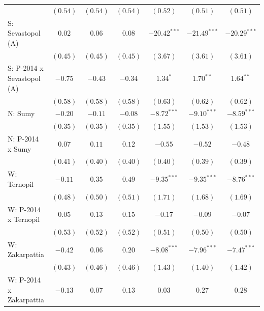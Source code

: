 \begin{table}
\begin{center}
\begin{small}
\begin{tabular}{l c c c c c c}
                            & $(0.54)$      & $(0.54)$       & $(0.54)$       & $(0.52)$       & $(0.51)$       & $(0.51)$       \\
S: Sevastopol (A)           & $0.02$        & $0.06$         & $0.08$         & $-20.42^{***}$ & $-21.49^{***}$ & $-20.29^{***}$ \\
                            & $(0.45)$      & $(0.45)$       & $(0.45)$       & $(3.67)$       & $(3.61)$       & $(3.61)$       \\
S: P-2014 x Sevastopol (A)  & $-0.75$       & $-0.43$        & $-0.34$        & $1.34^{*}$     & $1.70^{**}$    & $1.64^{**}$    \\
                            & $(0.58)$      & $(0.58)$       & $(0.58)$       & $(0.63)$       & $(0.62)$       & $(0.62)$       \\
N: Sumy                     & $-0.20$       & $-0.11$        & $-0.08$        & $-8.72^{***}$  & $-9.10^{***}$  & $-8.59^{***}$  \\
                            & $(0.35)$      & $(0.35)$       & $(0.35)$       & $(1.55)$       & $(1.53)$       & $(1.53)$       \\
N: P-2014 x Sumy            & $0.07$        & $0.11$         & $0.12$         & $-0.55$        & $-0.52$        & $-0.48$        \\
                            & $(0.41)$      & $(0.40)$       & $(0.40)$       & $(0.40)$       & $(0.39)$       & $(0.39)$       \\
W: Ternopil                 & $-0.11$       & $0.35$         & $0.49$         & $-9.35^{***}$  & $-9.35^{***}$  & $-8.76^{***}$  \\
                            & $(0.48)$      & $(0.50)$       & $(0.51)$       & $(1.71)$       & $(1.68)$       & $(1.69)$       \\
W: P-2014 x Ternopil        & $0.05$        & $0.13$         & $0.15$         & $-0.17$        & $-0.09$        & $-0.07$        \\
                            & $(0.53)$      & $(0.52)$       & $(0.52)$       & $(0.51)$       & $(0.50)$       & $(0.50)$       \\
W: Zakarpattia              & $-0.42$       & $0.06$         & $0.20$         & $-8.08^{***}$  & $-7.96^{***}$  & $-7.47^{***}$  \\
                            & $(0.43)$      & $(0.46)$       & $(0.46)$       & $(1.43)$       & $(1.40)$       & $(1.42)$       \\
W: P-2014 x Zakarpattia     & $-0.13$       & $0.07$         & $0.13$         & $0.03$         & $0.27$         & $0.28$         \\

\end{tabular}
\end{small}
\end{center}
\end{table}

